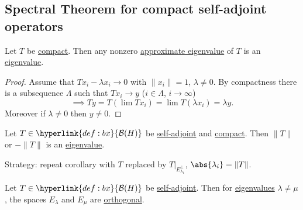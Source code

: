 \documentclass{article}
\begin{document}
\subsection{Spectral Theorem for compact self-adjoint operators}

\begin{lemma}
    Let $T$ be \hyperlink{def:compact}{compact}.
    Then any nonzero \hyperlink{def:ap}{approximate eigenvalue} of $T$ is an \hyperlink{def:eigen}{eigenvalue}.
\end{lemma}

\begin{proof}
    Assume that $T x_i - \lambda x_i \to 0$ with $\|x_i\| = 1$, $\lambda \neq 0$.
    By compactness there is a subsequence $\Lambda$ such that $T x_i \to y$ ($i \in \Lambda$, $i \to \infty$)
    \begin{equation*}
        \implies T y = T(\lim T x_i) = \lim T (\lambda x_i) = \lambda y.
    \end{equation*}
    Moreover if $\lambda \neq 0$ then $y \neq 0$.
\end{proof}

\begin{cor}
    Let $T \in \hyperlink{def:bx}{\mathcal{B}(H)}$ be \hyperlink{def:normalMap}{self-adjoint} and \hyperlink{def:compact}{compact}.
    Then $\|T\|$ or $- \|T\|$ is an \hyperlink{def:eigen}{eigenvalue}.
\end{cor}

Strategy: repeat corollary with $T$ replaced by $T|_{E_{\lambda_1}^\perp}$, $\abs{\lambda_i} = \|T\|$.

\begin{lemma}
    Let $T \in \hyperlink{def:bx}{\mathcal{B}(H)}$ be \hyperlink{def:normalMap}{self-adjoint}.
    Then for \hyperlink{def:eigen}{eigenvalues} $\lambda \neq \mu$, the spaces \hyperlink{def:espace}{$E_\lambda$} and $E_\mu$ are \hyperlink{def:ortho}{orthogonal}.
\end{lemma}
\end{document}
